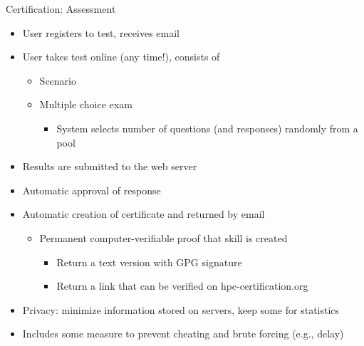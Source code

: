 \documentclass[compress,aspectratio=169]{beamer}
\begin{document}
\begin{frame}{Certification: Assessment}
		\begin{itemize}
      \item[\color{goettingenBlue}{1.}] User registers to test, receives email
			\item[\color{goettingenBlue}{2.}] User takes test online (any time!), consists of
			\begin{itemize}
        \item Scenario
        \item Multiple choice exam
        \begin{itemize}
          \item System selects number of questions (and responses) randomly from a pool
        \end{itemize}
			\end{itemize}
			\item[\color{goettingenBlue}{3.}] Results are submitted to the web server
			\item[\color{goettingenBlue}{4.}] Automatic approval of response
			\item[\color{goettingenBlue}{5.}] Automatic creation of certificate and returned by email
			\begin{itemize}
							\item Permanent computer-verifiable proof that skill is created
							\begin{itemize}
								\item Return a text version with GPG signature
								\item Return a link that can be verified on hpc-certification.org
							\end{itemize}
			\end{itemize}
			\item Privacy: minimize information stored on servers, keep some for statistics
			\item Includes some measure to prevent cheating and brute forcing (e.g., delay)
		\end{itemize}
\end{frame}
\end{document}
